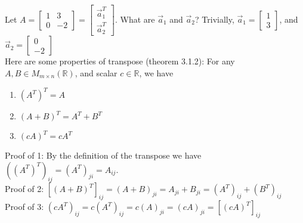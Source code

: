 \documentclass[10pt,letter]{article}
\begin{document}
Let $A = \begin{bmatrix}1&3\\0&-2\end{bmatrix}=\begin{bmatrix}\vec{a}_1^T\\\vec{a}_2^T\end{bmatrix}$. What are $\vec{a}_1$ and $\vec{a}_2$? Trivially, $\vec{a}_1=\begin{bmatrix}1\\3\end{bmatrix}$, and $\vec{a}_2=\begin{bmatrix}0\\-2\end{bmatrix}$ \\ 
Here are some properties of transpose (theorem 3.1.2): For any $A,B\in M_{m\times n}(\mathbb{R})$, and scalar $c\in\mathbb{R}$, we have  \begin{enumerate}
    \item $(A^T)^T=A$ 
    \item $(A+B)^T = A^T+B^T$ 
    \item $(cA)^T = cA^T$
\end{enumerate} 
Proof of 1: By the definition of the transpose we have $((A^T)^T)_{ij}=(A^T)_{ji}=A_{ij}$. \\ 
Proof of 2: $[(A+B)^T]_{ij}=(A+B)_{ji}=A_{ji}+B_{ji}=(A^T)_{ij}+(B^T)_{ij}$\\ 
Proof of 3: $(cA^T)_{ij}=c(A^T)_{ij}=c(A)_{ji}=(cA)_{ji}=[(cA)^T]_{ij}$ 
\end{document}
